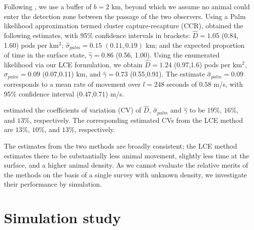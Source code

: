 \documentclass[useAMS, usenatbib, referee]{biom}\usepackage[]{graphicx}\usepackage[]{color}
\begin{document}
Following \cite{Stevenson+al:18}, we use a buffer of $b=2$ km, beyond which we assume no animal could enter the detection zone between the passage of the two observers.  Using a Palm likelihood approximation termed cluster capture-recapture (CCR), \cite{Stevenson+al:18} obtained the following estimates, with 95\% confidence intervals in brackets: $\hat{D}=1.05$ (0.84, 1.60) pods per km$^2$; $\hat{\sigma}_{palm}=0.15$ $(0.11, 0.19)$ km; and the expected proportion of time in the surface state, $\hat{\gamma}=0.86$ (0.56, 1.00). Using the enumerated likelihood via our LCE formulation, we obtain $\hat{D}=1.24$ (0.97,1.6) pods per km$^2$, $\hat{\sigma}_{palm}=0.09$ (0.07,0.11) km, and $\hat{\gamma}=0.73$ (0.55,0.91). The estimate $\hat{\sigma}_{palm}=0.09$ corresponds to a mean rate of movement over $l=248$ seconds of $0.58$ m/s, with 95\% confidence interval ($0.47$,$0.71$) m/s.

\cite{Stevenson+al:18} estimated the coefficients of variation (CV) of $\hat{D}$, $\hat{\sigma}_{palm}$ and $\hat{\gamma}$ to be $19$\%, $16$\%, and $13$\%, respectively. The corresponding estimated CVs from the LCE method are $13$\%, $10$\%, and $13$\%, respectively.

The estimates from the two methods are broadly consistent; the LCE method estimates there to be substantially less animal movement, slightly less time at the surface, and a higher animal density. As we cannot evaluate the relative merits of the methods on the basis of a single survey with unknown density, we investigate their performance by simulation.


\section{Simulation study \label{sec:sim}}


\end{document}
